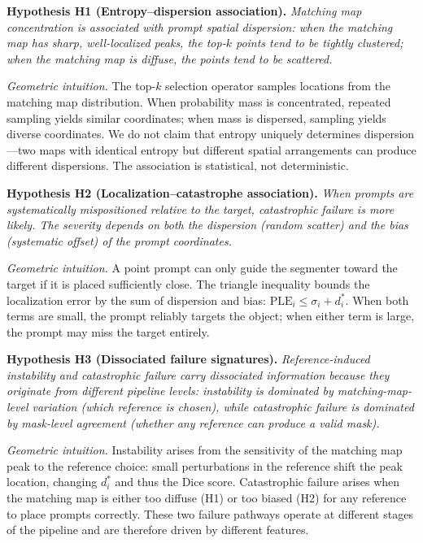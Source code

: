 \documentclass[11pt]{article}
\begin{document}
\medskip\noindent
\textbf{Hypothesis H1 (Entropy--dispersion association).}
\emph{Matching map concentration is associated with prompt spatial
dispersion: when the matching map has sharp, well-localized peaks, the
top-$k$ points tend to be tightly clustered; when the matching map is
diffuse, the points tend to be scattered.}

\noindent\textit{Geometric intuition.} The top-$k$ selection operator
samples locations from the matching map distribution. When probability mass
is concentrated, repeated sampling yields similar coordinates; when mass is
dispersed, sampling yields diverse coordinates. We do not claim that entropy
uniquely determines dispersion---two maps with identical entropy but
different spatial arrangements can produce different dispersions. The
association is statistical, not deterministic.

\medskip\noindent
\textbf{Hypothesis H2 (Localization--catastrophe association).}
\emph{When prompts are systematically mispositioned relative to the target,
catastrophic failure is more likely. The severity depends on both the
dispersion (random scatter) and the bias (systematic offset) of the prompt
coordinates.}

\noindent\textit{Geometric intuition.} A point prompt can only guide the
segmenter toward the target if it is placed sufficiently close. The
triangle inequality bounds the localization error by the sum of dispersion
and bias: $\text{PLE}_i \leq \sigma_i + d^*_i$. When both terms are small,
the prompt reliably targets the object; when either term is large, the
prompt may miss the target entirely.

\medskip\noindent
\textbf{Hypothesis H3 (Dissociated failure signatures).}
\emph{Reference-induced instability and catastrophic failure carry
dissociated information because they originate from different pipeline
levels: instability is dominated by matching-map-level variation (which
reference is chosen), while catastrophic failure is dominated by
mask-level agreement (whether any reference can produce a valid mask).}

\noindent\textit{Geometric intuition.} Instability arises from the
sensitivity of the matching map peak to the reference choice: small
perturbations in the reference shift the peak location, changing $d^*_i$ and
thus the Dice score. Catastrophic failure arises when the matching map is
either too diffuse (H1) or too biased (H2) for any reference to place
prompts correctly. These two failure pathways operate at different stages of
the pipeline and are therefore driven by different features.
\end{document}
